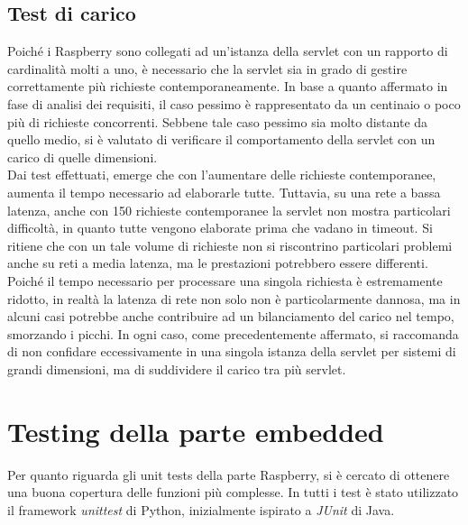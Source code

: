 \subsection{Test di carico}
Poiché i Raspberry sono collegati ad un'istanza della servlet con un rapporto di cardinalità molti a uno, è necessario che la servlet sia in grado di gestire correttamente più richieste contemporaneamente.
In base a quanto affermato in fase di analisi dei requisiti, il caso pessimo è rappresentato da un centinaio o poco più di richieste concorrenti.
Sebbene tale caso pessimo sia molto distante da quello medio, si è valutato di verificare il comportamento della servlet con un carico di quelle dimensioni.
\\Dai test effettuati, emerge che con l'aumentare delle richieste contemporanee, aumenta il tempo necessario ad elaborarle tutte.
Tuttavia, su una rete a bassa latenza, anche con 150 richieste contemporanee la servlet non mostra particolari difficoltà, in quanto tutte vengono elaborate prima che vadano in timeout.
Si ritiene che con un tale volume di richieste non si riscontrino particolari problemi anche su reti a media latenza, ma le prestazioni potrebbero essere differenti.
Poiché il tempo necessario per processare una singola richiesta è estremamente ridotto, in realtà la latenza di rete non solo non è particolarmente dannosa, ma in alcuni casi potrebbe anche contribuire ad un bilanciamento del carico nel tempo, smorzando i picchi.
In ogni caso, come precedentemente affermato, si raccomanda di non confidare eccessivamente in una singola istanza della servlet per sistemi di grandi dimensioni, ma di suddividere il carico tra più servlet.


\section{Testing della parte embedded}
Per quanto riguarda gli unit tests della parte Raspberry, si è cercato di ottenere una buona copertura delle funzioni più complesse.
In tutti i test è stato utilizzato il framework \textit{unittest} di Python, inizialmente ispirato a \textit{JUnit} di Java.

